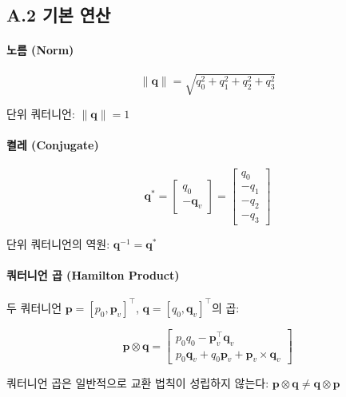 \subsection*{A.2 기본 연산}
 
\paragraph{노름 (Norm)}
 
\begin{equation}
    \|\mathbf{q}\| = \sqrt{q_0^2 + q_1^2 + q_2^2 + q_3^2}
    \tag{A.4}
\end{equation}
 
단위 쿼터니언: $\|\mathbf{q}\| = 1$
 
\paragraph{켤레 (Conjugate)}
 
\begin{equation}
    \mathbf{q}^* = \begin{bmatrix} q_0 \\ -\mathbf{q}_v \end{bmatrix} =
    \begin{bmatrix} q_0 \\ -q_1 \\ -q_2 \\ -q_3 \end{bmatrix}
    \tag{A.5}
\end{equation}
 
단위 쿼터니언의 역원: $\mathbf{q}^{-1} = \mathbf{q}^*$
 
\paragraph{쿼터니언 곱 (Hamilton Product)}
 
두 쿼터니언 $\mathbf{p} = [p_0, \mathbf{p}_v]^\top$,
$\mathbf{q} = [q_0, \mathbf{q}_v]^\top$의 곱:
 
\begin{equation}
    \mathbf{p} \otimes \mathbf{q} =
    \begin{bmatrix}
        p_0 q_0 - \mathbf{p}_v^\top \mathbf{q}_v \\
        p_0 \mathbf{q}_v + q_0 \mathbf{p}_v + \mathbf{p}_v \times \mathbf{q}_v
    \end{bmatrix}
    \tag{A.6}
\end{equation}
 
쿼터니언 곱은 일반적으로 교환 법칙이 성립하지 않는다:
$\mathbf{p} \otimes \mathbf{q} \neq \mathbf{q} \otimes \mathbf{p}$
 

